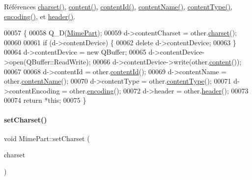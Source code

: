 Références \hyperlink{class_simple_mail_1_1_mime_part_a419b2efe442eb59002ae14c8ab18f94e}{charset()}, \hyperlink{class_simple_mail_1_1_mime_part_a22fd1bc02bce6c9655d879fd71620bf5}{content()}, \hyperlink{class_simple_mail_1_1_mime_part_a95fbca14bef123a2b65227f4d26622a5}{content\+Id()}, \hyperlink{class_simple_mail_1_1_mime_part_ad16adf3afc9873b4b0636cd3264e2f3e}{content\+Name()}, \hyperlink{class_simple_mail_1_1_mime_part_a3952c9506cc3baf478ecf3a8c204297a}{content\+Type()}, \hyperlink{class_simple_mail_1_1_mime_part_a7e7b2d8b6f32175fbc9d62e5b23ca720}{encoding()}, et \hyperlink{class_simple_mail_1_1_mime_part_a87f3646cf7e63664d3d92d087afd76ae}{header()}.


\begin{DoxyCode}
00057 \{
00058     Q\_D(\hyperlink{class_simple_mail_1_1_mime_part}{MimePart});
00059     d->contentCharset = other.\hyperlink{class_simple_mail_1_1_mime_part_a419b2efe442eb59002ae14c8ab18f94e}{charset}();
00060 
00061     \textcolor{keywordflow}{if} (d->contentDevice) \{
00062         \textcolor{keyword}{delete} d->contentDevice;
00063     \}
00064     d->contentDevice = \textcolor{keyword}{new} QBuffer;
00065     d->contentDevice->open(QBuffer::ReadWrite);
00066     d->contentDevice->write(other.\hyperlink{class_simple_mail_1_1_mime_part_a22fd1bc02bce6c9655d879fd71620bf5}{content}());
00067 
00068     d->contentId = other.\hyperlink{class_simple_mail_1_1_mime_part_a95fbca14bef123a2b65227f4d26622a5}{contentId}();
00069     d->contentName = other.\hyperlink{class_simple_mail_1_1_mime_part_ad16adf3afc9873b4b0636cd3264e2f3e}{contentName}();
00070     d->contentType = other.\hyperlink{class_simple_mail_1_1_mime_part_a3952c9506cc3baf478ecf3a8c204297a}{contentType}();
00071     d->contentEncoding = other.\hyperlink{class_simple_mail_1_1_mime_part_a7e7b2d8b6f32175fbc9d62e5b23ca720}{encoding}();
00072     d->header = other.\hyperlink{class_simple_mail_1_1_mime_part_a87f3646cf7e63664d3d92d087afd76ae}{header}();
00073 
00074     \textcolor{keywordflow}{return} *\textcolor{keyword}{this};
00075 \}
\end{DoxyCode}
\mbox{\label{class_simple_mail_1_1_mime_part_a3ec15032385ee5687112e2e808d6170f}} 
\paragraph{\texorpdfstring{set\+Charset()}{setCharset()}}
{\footnotesize\ttfamily void Mime\+Part\+::set\+Charset (\begin{DoxyParamCaption}\item[{const Q\+Byte\+Array \&}]{charset }\end{DoxyParamCaption})}



